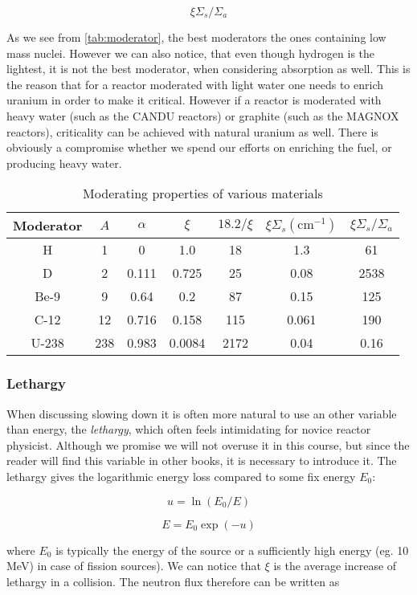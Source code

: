 $$\xi\Sigma_s/\Sigma_a$$

\noindent As we see from \autoref{tab:moderator}, the best moderators the ones containing low mass nuclei. However we can also notice, that even though hydrogen is the lightest, it is not the best moderator, when considering absorption as well. This is the reason that for a reactor moderated with light water one needs to enrich uranium in order to make it critical. However if a reactor is moderated with heavy water (such as the CANDU reactors) or graphite (such as the MAGNOX reactors), criticality can be achieved with natural uranium as well. There is obviously a compromise whether we spend our efforts on enriching the fuel, or producing heavy water. 


\begin{table}\caption{Moderating properties of various materials}\label{tab:moderator}
\begin{tabular}{c | c | c | c | c | c | c}
Moderator & $A$ & $\alpha$ & $\xi$ & $18.2/\xi$ & $\xi\Sigma_s (\text{cm}^{-1})$ & $\xi\Sigma_s/\Sigma_a$ \\
\hline
H & 1 & 0 & 1.0 & 18 & 1.3 & 61 \\
D & 2 & 0.111 & 0.725 & 25 & 0.08 & 2538 \\
Be-9 & 9 & 0.64 & 0.2 & 87 & 0.15 & 125 \\
C-12 & 12 & 0.716 & 0.158 & 115 & 0.061 & 190 \\
U-238 & 238 & 0.983 & 0.0084 & 2172 & 0.04 & 0.16
\end{tabular}
\end{table}

\subsubsection*{Lethargy}

When discussing slowing down it is often more natural to use an other variable than energy, the \textit{lethargy}, which often feels intimidating for novice reactor physicist. Although we promise we will not overuse it in this course, but since the reader will find this variable in other books, it is necessary to introduce it. The lethargy gives the logarithmic energy loss compared to some fix energy $E_0$:

$$u=\ln(E_0/E)$$

$$E=E_0\exp(-u)$$

\noindent where $E_0$ is typically the energy of the source or a sufficiently high energy (eg. 10 MeV) in case of fission sources). We can notice  that $\xi$ is the average increase of lethargy in a collision. The neutron flux therefore can be written as

